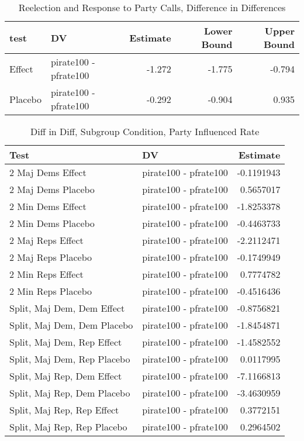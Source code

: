 \documentclass[12pt]{article}
\begin{document}
\begin{table}[H]
	\centering
	\singlespacing
	\caption{Reelection and Response to Party Calls, Difference in Differences} 
	\begin{tabular}{llrrr}
		\hline
		test & DV & Estimate & Lower Bound & Upper Bound \\ 
		\hline
		Effect & pirate100 - pfrate100 & -1.272 & -1.775 & -0.794 \\ 
		Placebo & pirate100 - pfrate100 & -0.292 & -0.904 & 0.935 \\ 
		\hline
	\end{tabular}
\end{table}

\begin{table}[H]
	\centering
	\caption{Diff in Diff, Subgroup Condition, Party Influenced Rate} 
	\begin{tabular}{llr}
		\hline
		Test & DV & Estimate \\ 
		\hline
		2 Maj Dems Effect & pirate100 - pfrate100 & -0.1191943 \\ 
		2 Maj Dems Placebo & pirate100 - pfrate100 & 0.5657017 \\ 
		2 Min Dems Effect & pirate100 - pfrate100 & -1.8253378 \\ 
		2 Min Dems Placebo & pirate100 - pfrate100 & -0.4463733 \\ 
		2 Maj Reps Effect & pirate100 - pfrate100 & -2.2112471 \\ 
		2 Maj Reps Placebo & pirate100 - pfrate100 & -0.1749949 \\ 
		2 Min Reps Effect & pirate100 - pfrate100 & 0.7774782 \\ 
		2 Min Reps Placebo & pirate100 - pfrate100 & -0.4516436 \\ 
		Split, Maj Dem, Dem Effect & pirate100 - pfrate100 & -0.8756821 \\ 
		Split, Maj Dem, Dem Placebo & pirate100 - pfrate100 & -1.8454871 \\ 
		Split, Maj Dem, Rep Effect & pirate100 - pfrate100 & -1.4582552 \\ 
		Split, Maj Dem, Rep Placebo & pirate100 - pfrate100 & 0.0117995 \\ 
		Split, Maj Rep, Dem Effect & pirate100 - pfrate100 & -7.1166813 \\ 
		Split, Maj Rep, Dem Placebo & pirate100 - pfrate100 & -3.4630959 \\ 
		Split, Maj Rep, Rep Effect & pirate100 - pfrate100 & 0.3772151 \\ 
		Split, Maj Rep, Rep Placebo & pirate100 - pfrate100 & 0.2964502 \\ 
		\hline
	\end{tabular}
\end{table}
\end{document}
